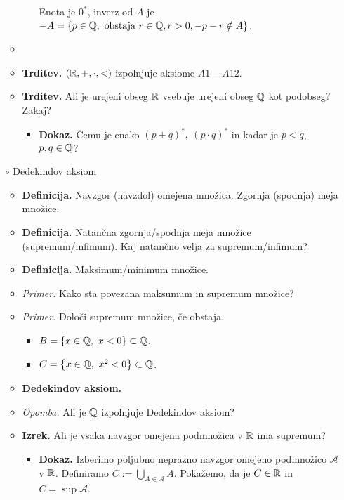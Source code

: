 \begin{enumerate}
\begin{itemize}
\begin{itemize}
            Enota je $0^*$, inverz od $A$ je             
            $-A = \left\{p \in \mathbb{Q}; \ \text{obstaja } r \in \mathbb{Q}, r>0, -p-r \notin A\right\}$.
        \end{itemize}
        \item \item \colorbox{blue!30}{\textbf{Trditev.}} $(\mathbb{R}, +, \cdot, <)$ izpolnjuje aksiome $A1-A12$.
        \item \colorbox{blue!30}{\textbf{Trditev.}} Ali je urejeni obseg $\mathbb{R}$ vsebuje urejeni obseg $\mathbb{Q}$ kot podobseg? Zakaj?
        \begin{itemize}
            \item \colorbox{green!30}{\textbf{Dokaz.}} Čemu je enako $(p+q)^*, \ (p \cdot q)^*$ in kadar je $p < q$, $p, q \in \mathbb{Q}$?
        \end{itemize}
    \end{itemize}
    \item[$\circ$] Dedekindov aksiom
    \begin{itemize}
        \item \colorbox{purple!30}{\textbf{Definicija.}} Navzgor (navzdol) omejena množica. Zgornja (spodnja) meja množice. 
        \item \colorbox{purple!30}{\textbf{Definicija.}} Natančna zgornja/spodnja meja množice (supremum/infimum). Kaj natančno velja za supremum/infimum?
        \item \colorbox{purple!30}{\textbf{Definicija.}} Maksimum/minimum množice.
        \item \colorbox{yellow!30}{\emph{Primer.}} Kako sta povezana maksumum in supremum množice?
        \item \colorbox{yellow!30}{\emph{Primer.}} Določi supremum množice, če obstaja.
        \begin{itemize}
            \item $B = \left\{x \in \mathbb{Q}, \ x<0\right\} \subset \mathbb{Q}$.
            \item $C = \left\{x \in \mathbb{Q}, \ x^2<0\right\} \subset \mathbb{Q}$.
        \end{itemize}
        \item \colorbox{blue!30}{\textbf{Dedekindov aksiom.}}
        \item \colorbox{yellow!30}{\emph{Opomba.}} Ali je $\mathbb{Q}$ izpolnjuje Dedekindov aksiom?
        \item \colorbox{blue!30}{\textbf{Izrek.}} Ali je vsaka navzgor omejena podmnožica v $\mathbb{R}$ ima supremum?
        \begin{itemize}
            \item \colorbox{green!30}{\textbf{Dokaz.}} Izberimo poljubno neprazno navzgor omejeno podmnožico $\mathcal{A}$ v $\mathbb{R}$. Definiramo $C := \bigcup_{A \in \mathcal{A}}A$. Pokažemo, da je $C \in \mathbb{R}$ in $C = \sup \mathcal{A}$.

\end{itemize}
\end{itemize}
\end{enumerate}
